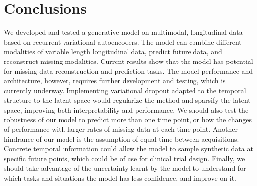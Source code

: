 \section{Conclusions}
\label{rnn:conclusions}

We developed and tested a generative model on multimodal, longitudinal data based on recurrent variational autoencoders. The model can combine different modalities of variable length longitudinal data, predict future data, and reconstruct missing modalities. Current results show that the model has potential for missing data reconstruction and prediction tasks. The model performance and architecture, however, requires further development and testing, which is currently underway. Implementing variational dropout adapted to the temporal structure to the latent space would regularize the method and sparsify the latent space, improving both interpretability and performance. We should also test the robustness of our model to predict more than one time point, or how the changes of performance with larger rates of missing data at each time point. Another hindrance of our model is the assumption of equal time between acquisitions. Concrete temporal information could allow the model to sample synthetic data at specific future points, which could be of use for clinical trial design. Finally, we should take advantage of the uncertainty learnt by the model to understand for which tasks and situations the model has less confidence, and improve on it.  \\